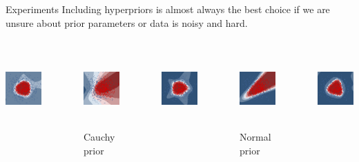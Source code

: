 \documentclass{beamer}
\begin{document}
\begin{frame}{Experiments}
	Including hyperpriors is almost always the best choice if we are unsure about prior parameters or data is noisy and hard.
	\begin{columns}[t]
		\centering
		\includegraphics[width=3.5cm,height=3cm]{pres_pics/h_cauchy.png}
		\vspace{-9mm}
		\begin{figure}
			\includegraphics[width=3.5cm,height=3cm]{pres_pics/p_cauchy.png}
			\caption{Cauchy prior}
		\end{figure}
		\centering
		\includegraphics[width=3.5cm,height=3cm]{pres_pics/h_gauss.png}
		\vspace{-9mm}
		\begin{figure}
			\includegraphics[width=3.5cm,height=3cm]{pres_pics/p_gauss.png}
			\caption{Normal prior}
		\end{figure}
		\centering
		\includegraphics[width=3.5cm,height=3cm]{pres_pics/h_laplace.png}

\end{columns}
\end{frame}
\end{document}
